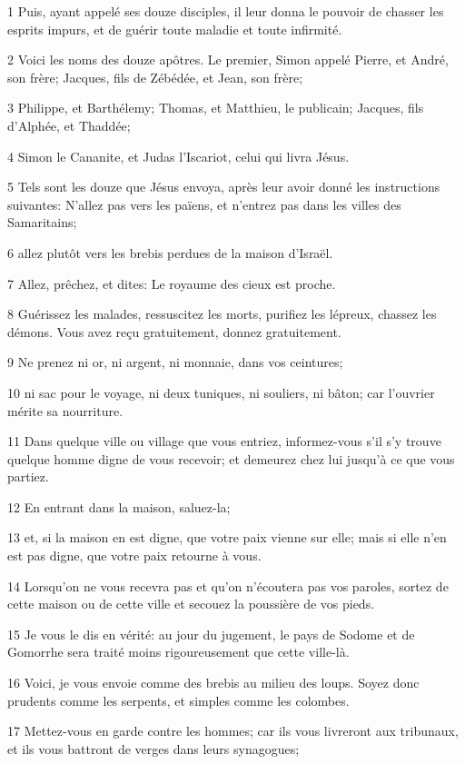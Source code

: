 \par 1 Puis, ayant appelé ses douze disciples, il leur donna le pouvoir de chasser les esprits impurs, et de guérir toute maladie et toute infirmité.
\par 2 Voici les noms des douze apôtres. Le premier, Simon appelé Pierre, et André, son frère; Jacques, fils de Zébédée, et Jean, son frère;
\par 3 Philippe, et Barthélemy; Thomas, et Matthieu, le publicain; Jacques, fils d'Alphée, et Thaddée;
\par 4 Simon le Cananite, et Judas l'Iscariot, celui qui livra Jésus.
\par 5 Tels sont les douze que Jésus envoya, après leur avoir donné les instructions suivantes: N'allez pas vers les païens, et n'entrez pas dans les villes des Samaritains;
\par 6 allez plutôt vers les brebis perdues de la maison d'Israël.
\par 7 Allez, prêchez, et dites: Le royaume des cieux est proche.
\par 8 Guérissez les malades, ressuscitez les morts, purifiez les lépreux, chassez les démons. Vous avez reçu gratuitement, donnez gratuitement.
\par 9 Ne prenez ni or, ni argent, ni monnaie, dans vos ceintures;
\par 10 ni sac pour le voyage, ni deux tuniques, ni souliers, ni bâton; car l'ouvrier mérite sa nourriture.
\par 11 Dans quelque ville ou village que vous entriez, informez-vous s'il s'y trouve quelque homme digne de vous recevoir; et demeurez chez lui jusqu'à ce que vous partiez.
\par 12 En entrant dans la maison, saluez-la;
\par 13 et, si la maison en est digne, que votre paix vienne sur elle; mais si elle n'en est pas digne, que votre paix retourne à vous.
\par 14 Lorsqu'on ne vous recevra pas et qu'on n'écoutera pas vos paroles, sortez de cette maison ou de cette ville et secouez la poussière de vos pieds.
\par 15 Je vous le dis en vérité: au jour du jugement, le pays de Sodome et de Gomorrhe sera traité moins rigoureusement que cette ville-là.
\par 16 Voici, je vous envoie comme des brebis au milieu des loups. Soyez donc prudents comme les serpents, et simples comme les colombes.
\par 17 Mettez-vous en garde contre les hommes; car ils vous livreront aux tribunaux, et ils vous battront de verges dans leurs synagogues;
